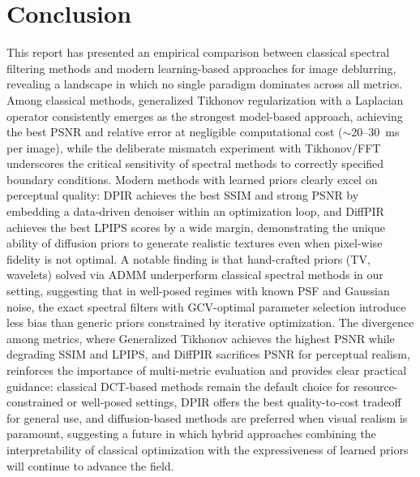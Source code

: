 \documentclass[12pt, a4paper, onecolumn]{article}
\theoremstyle{plain}          %
\theoremstyle{definition}     %
\theoremstyle{remark}
\begin{document}
\section{Conclusion}
\label{sec:conclusion}

This report has presented an empirical comparison between classical spectral filtering methods and modern learning-based approaches for image deblurring, revealing a landscape in which no single paradigm dominates across all metrics. Among classical methods, generalized Tikhonov regularization with a Laplacian operator consistently emerges as the strongest model-based approach, achieving the best PSNR and relative error at negligible computational cost ($\sim$20--30~ms per image), while the deliberate mismatch experiment with Tikhonov/FFT underscores the critical sensitivity of spectral methods to correctly specified boundary conditions. Modern methods with learned priors clearly excel on perceptual quality: DPIR achieves the best SSIM and strong PSNR by embedding a data-driven denoiser within an optimization loop, and DiffPIR achieves the best LPIPS scores by a wide margin, demonstrating the unique ability of diffusion priors to generate realistic textures even when pixel-wise fidelity is not optimal. A notable finding is that hand-crafted priors (TV, wavelets) solved via ADMM underperform classical spectral methods in our setting, suggesting that in well-posed regimes with known PSF and Gaussian noise, the exact spectral filters with GCV-optimal parameter selection introduce less bias than generic priors constrained by iterative optimization. The divergence among metrics, where Generalized Tikhonov achieves the highest PSNR while degrading SSIM and LPIPS, and DiffPIR sacrifices PSNR for perceptual realism, reinforces the importance of multi-metric evaluation and provides clear practical guidance: classical DCT-based methods remain the default choice for resource-constrained or well-posed settings, DPIR offers the best quality-to-cost tradeoff for general use, and diffusion-based methods are preferred when visual realism is paramount, suggesting a future in which hybrid approaches combining the interpretability of classical optimization with the expressiveness of learned priors will continue to advance the field.

\newpage
\printbibliography[heading=bibintoc]   %
\end{document}
